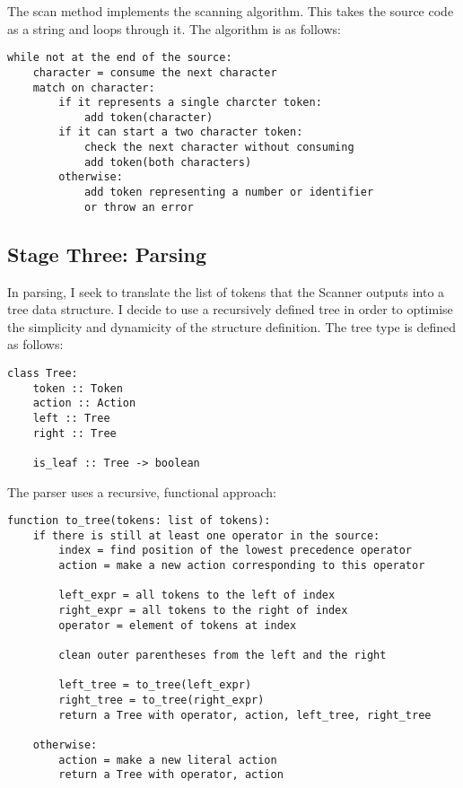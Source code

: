 \documentclass[a4paper, 12pt]{article}
\begin{document}
The scan method implements the scanning algorithm. This takes the source code as a string and loops through it. The algorithm is as follows:
\begin{verbatim}
while not at the end of the source:
    character = consume the next character
    match on character:
        if it represents a single charcter token:
            add token(character)
        if it can start a two character token:
            check the next character without consuming
            add token(both characters)
        otherwise:
            add token representing a number or identifier
            or throw an error

\end{verbatim}

\subsection{Stage Three: Parsing}\label{sec:stage-three-parsing}
In parsing, I seek to translate the list of tokens that the Scanner outputs into a tree data structure. I decide to use a recursively defined tree in order to optimise the simplicity and dynamicity of the structure definition. The tree type is defined as follows:\\
\begin{verbatim}
class Tree:
	token :: Token
	action :: Action
	left :: Tree
	right :: Tree

	is_leaf :: Tree -> boolean
\end{verbatim}

The parser uses a recursive, functional approach:
\begin{verbatim}
function to_tree(tokens: list of tokens):
	if there is still at least one operator in the source:
		index = find position of the lowest precedence operator
		action = make a new action corresponding to this operator
		
		left_expr = all tokens to the left of index
		right_expr = all tokens to the right of index
		operator = element of tokens at index
		
		clean outer parentheses from the left and the right
		
		left_tree = to_tree(left_expr)
		right_tree = to_tree(right_expr)
		return a Tree with operator, action, left_tree, right_tree
		
	otherwise:
		action = make a new literal action
		return a Tree with operator, action
\end{verbatim}
\end{document}
